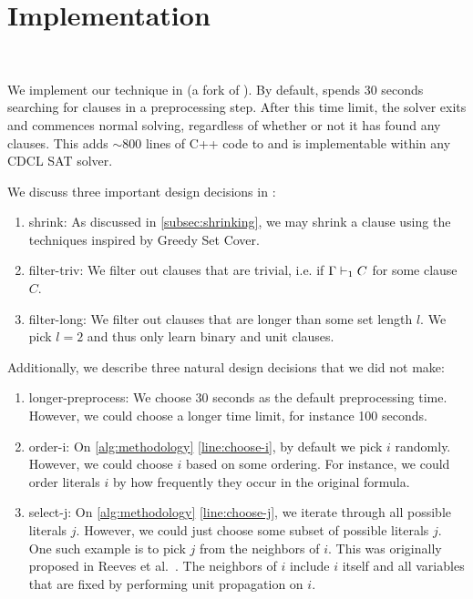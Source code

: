 \section{Implementation}~\label{sec:implementation}

We implement our technique in \tool (a fork of \cadical
). By default, \tool spends 30 seconds searching for \pr clauses in a preprocessing step. After this time limit, the solver exits and commences normal solving,
regardless of whether or not it has found any \pr clauses. This adds $\sim\!800$ lines
of C++ code to \cadical and is implementable within any CDCL SAT solver.

We discuss three important design decisions in \tool:

\begin{enumerate}
  \item \textsf{shrink}: As discussed in \autoref{subsec:shrinking}, we may
  shrink a clause using the techniques inspired by Greedy Set Cover.
  \item \textsf{filter-triv}: We filter out clauses that are trivial, i.e. if
  $\Gamma \vdash_1 C$ for some clause $C$.
  \item \textsf{filter-long}: We filter out clauses that are longer than some
  set length $l$. We pick $l = 2$ and thus only learn binary and unit
  clauses.
\end{enumerate}


Additionally, we describe three natural design decisions that we did not make:

\begin{enumerate}
  \item \textsf{longer-preprocess}: We choose 30 seconds as the default
  preprocessing time. However, we could choose a longer time limit, for instance
  100 seconds.
  \item \textsf{order-i}: On \autoref{alg:methodology} \autoref{line:choose-i},
  by default we pick $i$ randomly. However, we could choose $i$ based
  on some ordering. For instance, we could order literals $i$ by how frequently
  they occur in the original formula.
  \item \textsf{select-j}: On \autoref{alg:methodology} \autoref{line:choose-j},
  we iterate through all possible literals $j$. However, we
  could just choose some subset of possible literals $j$. One such example is to pick $j$ from 
  the neighbors of $i$. This was originally proposed in Reeves et al.~\cite{prelearn}.
  The neighbors of $i$ include $i$ itself and all variables that are fixed
  by performing unit propagation on $i$.
\end{enumerate}



